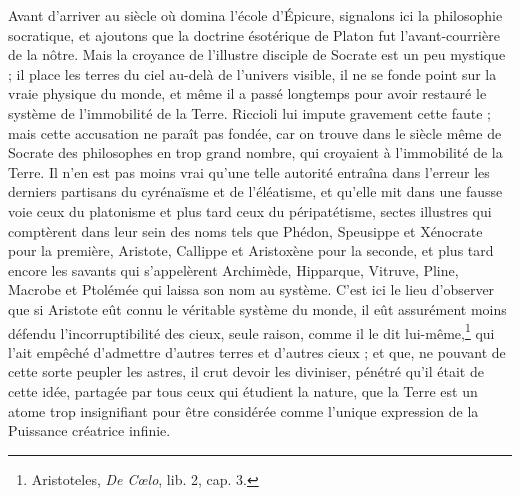 \documentclass[a4paper, 11pt, oneside]{article}
\begin{document}
Avant d'arriver au siècle où domina l'école d'Épicure, signalons ici la philosophie socratique, et ajoutons que la doctrine ésotérique de Platon fut l'avant-courrière de la nôtre. Mais la croyance de l'illustre disciple de Socrate est un peu mystique ; il place les terres du ciel au-delà de l'univers visible, il ne se fonde point sur la vraie physique du monde, et même il a passé longtemps pour avoir restauré le système de l'immobilité de la Terre. Riccioli lui impute gravement cette faute ; mais cette accusation ne paraît pas fondée, car on trouve dans le siècle même de Socrate des philosophes en trop grand nombre, qui croyaient à l'immobilité de la Terre. Il n'en est pas moins vrai qu'une telle autorité entraîna dans l'erreur les derniers partisans du cyrénaïsme et de l'éléatisme, et qu'elle mit dans une fausse voie ceux du platonisme et plus tard ceux du péripatétisme, sectes illustres qui comptèrent dans leur sein des noms tels que Phédon, Speusippe et Xénocrate pour la première, Aristote, Callippe et Aristoxène pour la seconde, et plus tard encore les savants qui s'appelèrent Archimède, Hipparque, Vitruve, Pline, Macrobe et Ptolémée qui laissa son nom au système. C'est ici le lieu d'observer que si Aristote eût connu le véritable système du monde, il eût assurément moins défendu l'incorruptibilité des cieux, seule raison, comme il le dit lui-même,\footnote{Aristoteles, \emph{De Cœlo}, lib. 2, cap. 3.} qui l'ait empêché d'admettre d'autres terres et d'autres cieux ; et que, ne pouvant de cette sorte peupler les astres, il crut devoir les diviniser, pénétré qu'il était de cette idée, partagée par tous ceux qui étudient la nature, que la Terre est un atome trop insignifiant pour être considérée comme l'unique expression de la Puissance créatrice infinie.
\end{document}
